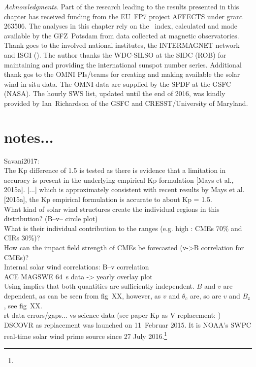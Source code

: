 \bigskip
{\small
\textit{Acknowledgments.} Part of the research leading to the results presented in this chapter has received funding from the EU~FP7 project AFFECTS under grant 263506.
The analyses in this chapter rely on the \Kp~index, calculated and made available by the GFZ~Potsdam from data collected at magnetic observatories. Thank goes to the involved national institutes, the INTERMAGNET network and ISGI (). The author thanks the WDC-SILSO at the SIDC (ROB) for maintaining and providing the international sunspot number series. Additional thank gos to the OMNI PIs/teams for creating and making available the solar wind in-situ data. The OMNI data are supplied by the SPDF at the GSFC (NASA). The hourly SWS list, updated until the end of 2016, was kindly provided by Ian~Richardson of the GSFC and CRESST/University of Maryland.
}


\section*{notes...}

Savani2017:\\
The Kp difference of 1.5 is tested as there is evidence that a limitation in accuracy is present in the underlying empirical Kp formulation [Mays et al., 2015a]. [...] which is approximately consistent with recent results by Mays et al. [2015a], the Kp empirical formulation is accurate to about Kp = 1.5.\\

What kind of solar wind structures create the individual regions in this distribution? (B--v--\Kp{} circle plot)\\
What is their individual contribution to the \Kp{} ranges (e.g. high \Kp{}: CMEs 70\% and CIRs 30\%)?\\

How can the impact field strength of CMEs be forecasted (v->B correlation for CMEs)?\\
Internal solar wind correlations: B--v correlation\\
ACE MAGSWE 64~s data -> yearly overlay plot\\

Using \vBz{} implies that both quantities are sufficiently independent. $B$ and $v$ are dependent, as can be seen from fig~XX, however, as $v$ and $\theta_c$ are, so are $v$ and $B_\text{z}$, see fig~XX.\\

rt data errors/gaps... vs science data (see paper Kp as V replacement: \citet{Machol2013})\\
DSCOVR as replacement was launched on 11~Februar 2015. It is NOAA's SWPC real-time solar wind prime source since 27 July 2016.\footnote{}\\


